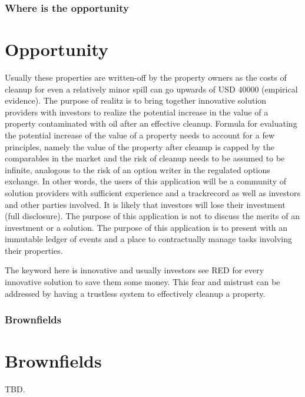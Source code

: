 \documentclass{beamer}
\begin{document}
\begin{frame}
\frametitle{Where is the opportunity}
\section {Opportunity}
Usually these properties are written-off by the property owners as the costs of cleanup for even a relatively minor spill can go upwards of USD 40000 (empirical evidence). The purpose of realitz is to bring together innovative solution providers with investors to realize the potential increase in the value of a property contaminated with oil after an effective cleanup. Formula for evaluating the potential increase of the value of a property needs to account for a few principles, namely the value of the property after cleanup is capped by the comparables in the market and the risk of cleanup needs to be assumed to be infinite, analogous to the risk of an option writer in the regulated options exchange. In other words, the users of this application will be a community of solution providers with sufficient experience and a trackrecord as well as investors and other parties involved. It is likely that investors will lose their investment (full disclosure). The purpose of this application is not to discuss the merits of an investment or a solution. The purpose of this application is to present with an immutable ledger of events and a place to contractually manage tasks involving their properties.

The keyword here is innovative and usually investors see RED for every innovative solution to save them some money. This fear and mistrust can be addressed by having a trustless system to effectively cleanup a property.
\end{frame}
\begin{frame}
\frametitle{Brownfields}
\section{Brownfields} \label{brownfields}
  TBD.
\end{frame}
\end{document}

